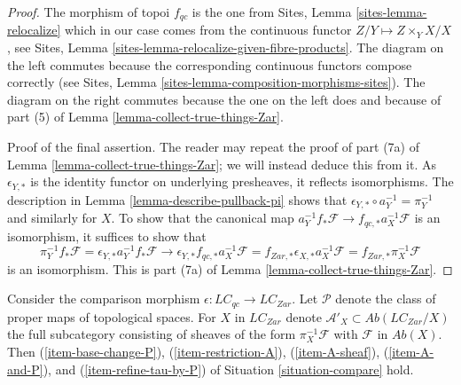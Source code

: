 \begin{proof}
The morphism of topoi $f_{qc}$ is the one from
Sites, Lemma \ref{sites-lemma-relocalize}
which in our case comes from the continuous functor
$Z/Y \mapsto Z \times_Y X/X$, see
Sites, Lemma \ref{sites-lemma-relocalize-given-fibre-products}.
The diagram on the left commutes because the corresponding
continuous functors compose correctly
(see Sites, Lemma \ref{sites-lemma-composition-morphisms-sites}).
The diagram on the right commutes because the one on the left does
and because of part (5) of Lemma \ref{lemma-collect-true-things-Zar}.

\medskip\noindent
Proof of the final assertion. The reader may repeat the proof of part (7a) of
Lemma \ref{lemma-collect-true-things-Zar}; we will instead deduce this from it.
As $\epsilon_{Y, *}$ is the identity functor on underlying presheaves,
it reflects isomorphisms. The description
in Lemma \ref{lemma-describe-pullback-pi}
shows that $\epsilon_{Y, *} \circ a_Y^{-1} = \pi_Y^{-1}$
and similarly for $X$. To show that the canonical map
$a_Y^{-1}f_*\mathcal{F} \to f_{qc, *}a_X^{-1}\mathcal{F}$
is an isomorphism, it suffices to show that
$$
\pi_Y^{-1}f_*\mathcal{F} =
\epsilon_{Y, *}a_Y^{-1}f_*\mathcal{F} \to
\epsilon_{Y, *}f_{qc, *}a_X^{-1}\mathcal{F} =
f_{Zar, *}\epsilon_{X, *}a_X^{-1}\mathcal{F} =
f_{Zar, *}\pi_X^{-1}\mathcal{F}
$$
is an isomorphism. This is part
(7a) of Lemma \ref{lemma-collect-true-things-Zar}.
\end{proof}

\begin{lemma}
\label{lemma-compare-qc-zar}
Consider the comparison morphism
$\epsilon : \textit{LC}_{qc} \to \textit{LC}_{Zar}$.
Let $\mathcal{P}$ denote the class of proper maps of topological spaces.
For $X$ in $\textit{LC}_{Zar}$ denote
$\mathcal{A}'_X \subset \textit{Ab}(\textit{LC}_{Zar}/X)$
the full subcategory consisting of sheaves of the form
$\pi_X^{-1}\mathcal{F}$ with $\mathcal{F}$ in $\textit{Ab}(X)$.
Then
(\ref{item-base-change-P}),
(\ref{item-restriction-A}),
(\ref{item-A-sheaf}),
(\ref{item-A-and-P}), and
(\ref{item-refine-tau-by-P})
of Situation \ref{situation-compare} hold.
\end{lemma}

